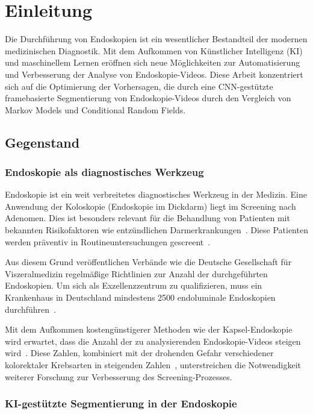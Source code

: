 \chapter{Einleitung}\label{ch:introduction}
Die Durchführung von Endoskopien ist ein wesentlicher Bestandteil der modernen medizinischen Diagnostik. Mit dem Aufkommen von Künstlicher Intelligenz (KI) und maschinellem Lernen eröffnen sich neue Möglichkeiten zur Automatisierung und Verbesserung der Analyse von Endoskopie-Videos. Diese Arbeit konzentriert sich auf die Optimierung der Vorhersagen, die durch eine CNN-gestützte framebasierte Segmentierung von Endoskopie-Videos durch den Vergleich von Markov Models und Conditional Random Fields.

\section{Gegenstand}

\subsection{Endoskopie als diagnostisches Werkzeug}

Endoskopie ist ein weit verbreitetes diagnostisches Werkzeug in der Medizin. Eine Anwendung der Koloskopie (Endoskopie im Dickdarm) liegt im Screening nach Adenomen. Dies ist besonders relevant für die Behandlung von Patienten mit bekannten Risikofaktoren wie entzündlichen Darmerkrankungen~\citep{vleggaar-2007}. Diese Patienten werden präventiv in Routineuntersuchungen gescreent~\citep{arnold-2020}.

Aus diesem Grund veröffentlichen Verbände wie die Deutsche Gesellschaft für Viszeralmedizin regelmäßige Richtlinien zur Anzahl der durchgeführten Endoskopien. Um sich als Exzellenzzentrum zu qualifizieren, muss ein Krankenhaus in Deutschland mindestens 2500 endoluminale Endoskopien durchführen~\citep{dgav-ev-2015}.

Mit dem Aufkommen kostengünstigerer Methoden wie der Kapsel-Endoskopie wird erwartet, dass die Anzahl der zu analysierenden Endoskopie-Videos steigen wird~\citep{koulaouzidis-2021}\citep{8903282}. Diese Zahlen, kombiniert mit der drohenden Gefahr verschiedener kolorektaler Krebsarten in steigenden Zahlen~\citep{acs-2024,ferlay-2024}, unterstreichen die Notwendigkeit weiterer Forschung zur Verbesserung des Screening-Prozesses.

\subsection{KI-gestützte Segmentierung in der Endoskopie}

